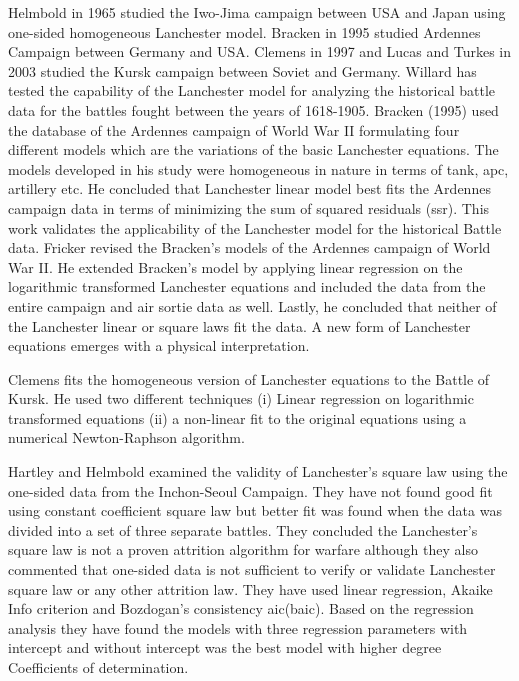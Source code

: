 \documentclass[]{article}
\begin{document}
Helmbold \autocite{Helmbold1965LetterTT}in 1965 studied the Iwo-Jima campaign between USA and Japan using one-sided homogeneous Lanchester model. Bracken in 1995 studied Ardennes Campaign between Germany and USA. Clemens in 1997 \autocite{Clemens:1997} and Lucas and Turkes in 2003 \autocite{LukasTurkes:2004} studied the Kursk campaign between Soviet and Germany. Willard \autocite{Willard1962LANCHESTERAF} has tested the capability of the Lanchester model for analyzing the historical battle data for the battles fought between the years of 1618-1905. 
Bracken\autocite{Bracken:1995} (1995) used the database of the Ardennes campaign of World War II formulating four different models which are the variations of the basic Lanchester equations. The models developed in his study were homogeneous in nature in terms of tank, \acrshort{apc}, artillery etc. He concluded that Lanchester linear model best fits the Ardennes campaign data in terms of minimizing the sum of squared residuals (\acrshort{ssr}). This work validates the applicability of the Lanchester model for the historical Battle data.
Fricker \autocite{Fricker:1998} revised the Bracken's models of the Ardennes campaign of World War II. He extended Bracken's model by applying linear regression on the logarithmic transformed Lanchester equations and included the data from the entire campaign and air sortie data as well. Lastly, he concluded that neither of the Lanchester linear or square laws fit the data. A new form of Lanchester equations emerges with a physical interpretation.

Clemens \autocite{Clemens:1997} fits the homogeneous version of Lanchester equations to the Battle of Kursk. He used two different techniques (i) Linear regression on logarithmic transformed equations (ii) a non-linear fit to the original equations using a numerical Newton-Raphson algorithm. 

Hartley and Helmbold \autocite{RePEc:wly:navres:v:42:y:1995:i:4:p:609-633} examined the validity of Lanchester's square law using the one-sided data from the Inchon-Seoul Campaign. They have not found good fit using constant coefficient square law but better fit was found when the data was divided into a set of three separate battles. They concluded the Lanchester's square law is not a proven attrition algorithm for warfare although they also commented that one-sided data is not sufficient to verify or validate Lanchester square law or any other attrition law. They have used linear regression, Akaike Info criterion and Bozdogan's consistency \acrshort{aic}(\acrshort{baic}). Based on the regression analysis they have found the models with three regression parameters with intercept and without intercept was the best model with higher degree Coefficients of determination.
\end{document}
